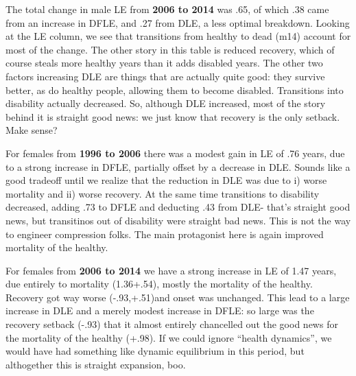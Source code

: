 The total change in male LE from \textbf{2006 to 2014} was .65, of which .38 came from an increase in DFLE, and .27 from DLE, a less optimal breakdown. Looking at the LE column, we see that transitions from healthy to dead (m14) account for most of the change. The other story in this table is reduced recovery, which of course steals more healthy years than it adds disabled years. The other two factors increasing DLE are things that are actually quite good: they survive better, as do healthy people, allowing them to become disabled. Transitions into disability actually decreased. So, although DLE increased, most of the story behind it is straight good news: we just know that recovery is the only setback. Make sense?
\begin{table}[!ht]
      \caption{Males (all edu)}
      \label{tab:males}
      \centering
{}
     \qquad
{}
\end{table}

For females from \textbf{1996 to 2006} there was a modest gain in LE of .76 years, due to a strong increase in DFLE, partially offset by a decrease in DLE. Sounds like a good tradeoff until we realize that the reduction in DLE was due to i) worse mortality and ii) worse recovery. At the same time transitions to disability decreased, adding .73 to DFLE and deducting .43 from DLE- that's straight good news, but transitinos out of disability were straight bad news. This is not the way to engineer compression folks. The main protagonist here is again improved mortality of the healthy.

For females from \textbf{2006 to 2014} we have a strong increase in LE of 1.47 years, due entirely to mortality (1.36+.54), mostly the mortality of the healthy. Recovery got way worse (-.93,+.51)and onset was unchanged. This lead to a large increase in DLE and a merely modest increase in DFLE: so large was the recovery setback (-.93) that it almost entirely chancelled out the good news for the mortality of the healthy (+.98). If we could ignore ``health dynamics'', we would have had something like dynamic equilibrium in this period, but althogether this is straight expansion, boo.


